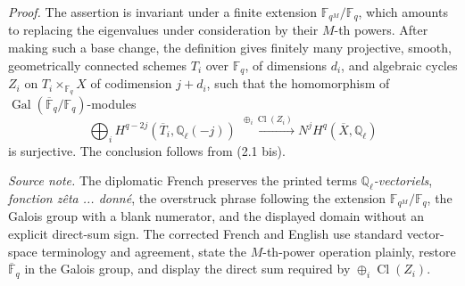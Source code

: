 \medskip
\noindent\emph{Proof.}
The assertion is invariant under a finite extension
$\mathbb F_{q^M}/\mathbb F_q$, which amounts to replacing the eigenvalues
under consideration by their $M$-th powers.  After making such a base
change, the definition gives finitely many projective, smooth, geometrically
connected schemes $T_i$ over $\mathbb F_q$, of dimensions $d_i$, and
algebraic cycles $Z_i$ on $T_i\times_{\mathbb F_q}X$ of codimension
$j+d_i$, such that the homomorphism of
$\operatorname{Gal}(\overline{\mathbb F}_q/\mathbb F_q)$-modules
\begin{equation*}
\bigoplus_i H^{q-2j}(\overline T_i,\mathbb Q_\ell(-j))
\xrightarrow{\ \oplus_i\operatorname{Cl}(Z_i)\ }
N^jH^q(\overline X,\mathbb Q_\ell)
\end{equation*}
is surjective.  The conclusion follows from (2.1 bis).

\medskip
\noindent\emph{Source note.}
The diplomatic French preserves the printed terms
\emph{$\mathbb Q_\ell$-vectoriels}, \emph{fonction zêta ... donné}, the
overstruck phrase following the extension $\mathbb F_{q^M}/\mathbb F_q$,
the Galois group with a blank numerator, and the displayed domain without
an explicit direct-sum sign.  The corrected French and English use standard
vector-space terminology and agreement, state the $M$-th-power operation
plainly, restore $\overline{\mathbb F}_q$ in the Galois group, and display
the direct sum required by $\oplus_i\operatorname{Cl}(Z_i)$.
